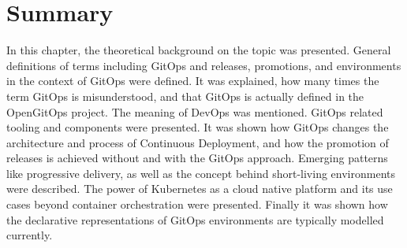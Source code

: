 \section{Summary}

In this chapter,
the theoretical background on the topic was presented.
General definitions of terms including GitOps and
releases, promotions, and environments in the context of GitOps were defined.
It was explained, how many times the term GitOps is misunderstood,
and that GitOps is actually defined in the OpenGitOps project.
The meaning of DevOps was mentioned.
GitOps related tooling and components were presented.
It was shown how GitOps changes the architecture and process of Continuous Deployment,
and how the promotion of releases is achieved without and with the GitOps approach.
Emerging patterns like progressive delivery,
as well as the concept behind short-living environments were described.
The power of Kubernetes as a cloud native platform and its use cases beyond container orchestration were presented.
Finally it was shown how the declarative representations of GitOps environments are typically modelled currently.
































